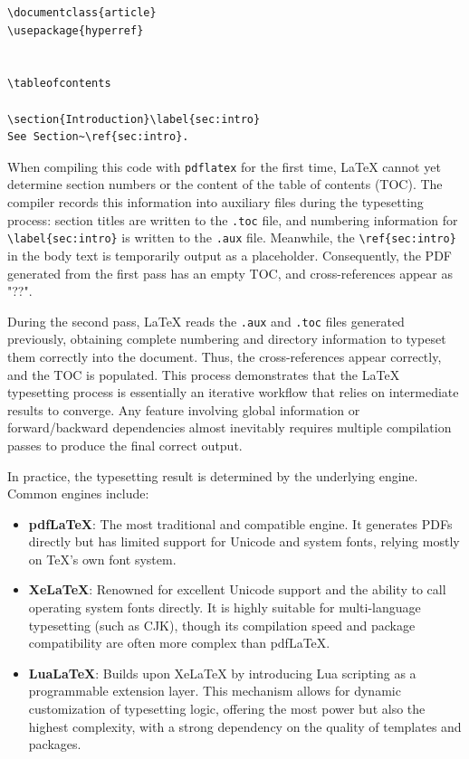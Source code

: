\begin{lstlisting}[caption={Cross-reference example},label={lst:crossref}]
\documentclass{article}
\usepackage{hyperref}


\tableofcontents

\section{Introduction}\label{sec:intro}
See Section~\ref{sec:intro}.

\end{lstlisting}

When compiling this code with \verb|pdflatex| for the first time, \LaTeX{} cannot yet determine section numbers or the content of the table of contents (TOC). The compiler records this information into auxiliary files during the typesetting process: section titles are written to the \verb|.toc| file, and numbering information for \verb|\label{sec:intro}| is written to the \verb|.aux| file. Meanwhile, the \verb|\ref{sec:intro}| in the body text is temporarily output as a placeholder. Consequently, the PDF generated from the first pass has an empty TOC, and cross-references appear as "??".

During the second pass, \LaTeX{} reads the \verb|.aux| and \verb|.toc| files generated previously, obtaining complete numbering and directory information to typeset them correctly into the document. Thus, the cross-references appear correctly, and the TOC is populated. This process demonstrates that the \LaTeX{} typesetting process is essentially an iterative workflow that relies on intermediate results to converge. Any feature involving global information or forward/backward dependencies almost inevitably requires multiple compilation passes to produce the final correct output.

In practice, the typesetting result is determined by the underlying engine. Common engines include:

\begin{itemize}
    \item \textbf{pdfLaTeX}: The most traditional and compatible engine. It generates PDFs directly but has limited support for Unicode and system fonts, relying mostly on \TeX{}'s own font system.
    \item \textbf{XeLaTeX}: Renowned for excellent Unicode support and the ability to call operating system fonts directly. It is highly suitable for multi-language typesetting (such as CJK), though its compilation speed and package compatibility are often more complex than pdfLaTeX.
    \item \textbf{LuaLaTeX}: Builds upon XeLaTeX by introducing Lua scripting as a programmable extension layer. This mechanism allows for dynamic customization of typesetting logic, offering the most power but also the highest complexity, with a strong dependency on the quality of templates and packages.
\end{itemize}

